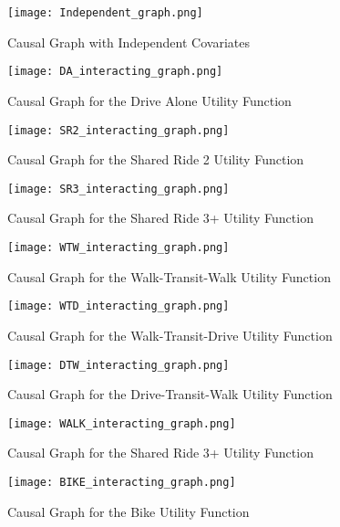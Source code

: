\begin{figure}
   \centering
   \texttt{[image: Independent\_graph.png]}
   \caption{Causal Graph with Independent Covariates}
   \label{fig:IND_GRAPH}
\end{figure}

\begin{figure}
   \centering
   \texttt{[image: DA\_interacting\_graph.png]}
   \caption{Causal Graph for the Drive Alone Utility Function}
   \label{fig:DA_causal_2}
\end{figure}

\begin{figure}
   \centering
   \texttt{[image: SR2\_interacting\_graph.png]}
   \caption{Causal Graph for the Shared Ride 2 Utility Function}
   \label{fig:SR2_causal_2}
\end{figure}

\begin{figure}
   \centering
   \texttt{[image: SR3\_interacting\_graph.png]}
   \caption{Causal Graph for the Shared Ride 3+ Utility Function}
   \label{fig:SR3_causal_2}
\end{figure}

\begin{figure}
   \centering
   \texttt{[image: WTW\_interacting\_graph.png]}
   \caption{Causal Graph for the Walk-Transit-Walk Utility Function}
   \label{fig:WTW_causal_2}
\end{figure}

\begin{figure}
   \centering
   \texttt{[image: WTD\_interacting\_graph.png]}
   \caption{Causal Graph for the Walk-Transit-Drive Utility Function}
   \label{fig:WTD_causal_2}
\end{figure}

\begin{figure}
   \centering
   \texttt{[image: DTW\_interacting\_graph.png]}
   \caption{Causal Graph for the Drive-Transit-Walk Utility Function}
   \label{fig:DTW_causal_2}
\end{figure}

\begin{figure}
   \centering
   \texttt{[image: WALK\_interacting\_graph.png]}
   \caption{Causal Graph for the Shared Ride 3+ Utility Function}
   \label{fig:WALK_causal_2}
\end{figure}

\begin{figure}
   \centering
   \texttt{[image: BIKE\_interacting\_graph.png]}
   \caption{Causal Graph for the Bike Utility Function}
   \label{fig:BIKE_causal_2}
\end{figure}

